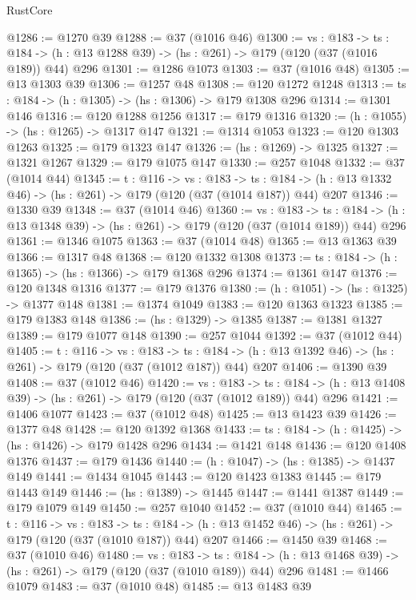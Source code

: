 \begin{lexlean}{RustCore}
\begin{coremodule}
@1286 := @1270 @39
@1288 := @37 (@1016 @46)
@1300 := {vs : @183} ->
  {ts : @184} -> (h : @13 @1288 @39) -> (hs : @261) -> @179 (@120 (@37 (@1016 @189)) @44) @296
@1301 := @1286 @1073
@1303 := @37 (@1016 @48)
@1305 := @13 @1303 @39
@1306 := @1257 @48
@1308 := @120 @1272 @1248
@1313 := {ts : @184} -> (h : @1305) -> (hs : @1306) -> @179 @1308 @296
@1314 := @1301 @146
@1316 := @120 @1288 @1256
@1317 := @179 @1316
@1320 := (h : @1055) -> (hs : @1265) -> @1317 @147
@1321 := @1314 @1053
@1323 := @120 @1303 @1263
@1325 := @179 @1323 @147
@1326 := (hs : @1269) -> @1325
@1327 := @1321 @1267
@1329 := @179 @1075 @147
@1330 := @257 @1048
@1332 := @37 (@1014 @44)
@1345 := {t : @116} ->
  {vs : @183} ->
  {ts : @184} -> (h : @13 @1332 @46) -> (hs : @261) -> @179 (@120 (@37 (@1014 @187)) @44) @207
@1346 := @1330 @39
@1348 := @37 (@1014 @46)
@1360 := {vs : @183} ->
  {ts : @184} -> (h : @13 @1348 @39) -> (hs : @261) -> @179 (@120 (@37 (@1014 @189)) @44) @296
@1361 := @1346 @1075
@1363 := @37 (@1014 @48)
@1365 := @13 @1363 @39
@1366 := @1317 @48
@1368 := @120 @1332 @1308
@1373 := {ts : @184} -> (h : @1365) -> (hs : @1366) -> @179 @1368 @296
@1374 := @1361 @147
@1376 := @120 @1348 @1316
@1377 := @179 @1376
@1380 := (h : @1051) -> (hs : @1325) -> @1377 @148
@1381 := @1374 @1049
@1383 := @120 @1363 @1323
@1385 := @179 @1383 @148
@1386 := (hs : @1329) -> @1385
@1387 := @1381 @1327
@1389 := @179 @1077 @148
@1390 := @257 @1044
@1392 := @37 (@1012 @44)
@1405 := {t : @116} ->
  {vs : @183} ->
  {ts : @184} -> (h : @13 @1392 @46) -> (hs : @261) -> @179 (@120 (@37 (@1012 @187)) @44) @207
@1406 := @1390 @39
@1408 := @37 (@1012 @46)
@1420 := {vs : @183} ->
  {ts : @184} -> (h : @13 @1408 @39) -> (hs : @261) -> @179 (@120 (@37 (@1012 @189)) @44) @296
@1421 := @1406 @1077
@1423 := @37 (@1012 @48)
@1425 := @13 @1423 @39
@1426 := @1377 @48
@1428 := @120 @1392 @1368
@1433 := {ts : @184} -> (h : @1425) -> (hs : @1426) -> @179 @1428 @296
@1434 := @1421 @148
@1436 := @120 @1408 @1376
@1437 := @179 @1436
@1440 := (h : @1047) -> (hs : @1385) -> @1437 @149
@1441 := @1434 @1045
@1443 := @120 @1423 @1383
@1445 := @179 @1443 @149
@1446 := (hs : @1389) -> @1445
@1447 := @1441 @1387
@1449 := @179 @1079 @149
@1450 := @257 @1040
@1452 := @37 (@1010 @44)
@1465 := {t : @116} ->
  {vs : @183} ->
  {ts : @184} -> (h : @13 @1452 @46) -> (hs : @261) -> @179 (@120 (@37 (@1010 @187)) @44) @207
@1466 := @1450 @39
@1468 := @37 (@1010 @46)
@1480 := {vs : @183} ->
  {ts : @184} -> (h : @13 @1468 @39) -> (hs : @261) -> @179 (@120 (@37 (@1010 @189)) @44) @296
@1481 := @1466 @1079
@1483 := @37 (@1010 @48)
@1485 := @13 @1483 @39

\end{coremodule}
\end{lexlean}

